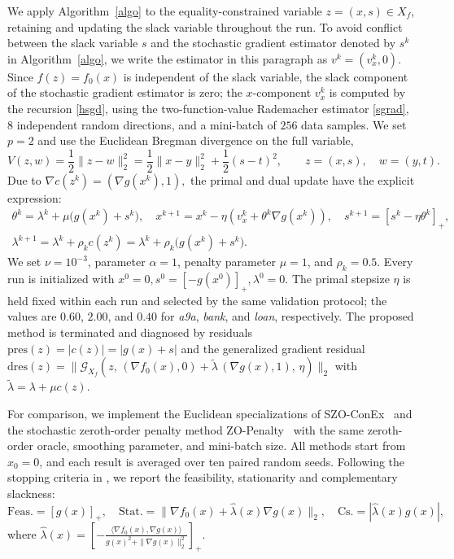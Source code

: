 \documentclass[11pt]{article}
\numberwithin{equation}{section}
\begin{document}
We apply Algorithm~\ref{algo} to the equality-constrained variable
\(z=(x,s)\in X_f\), retaining and updating the slack variable throughout the run.
To avoid conflict between the slack variable \(s\) and the stochastic gradient estimator
denoted by \(s^k\) in Algorithm~\ref{algo}, we write the estimator in this paragraph as
\(v^k=(v_x^k,0)\). Since \(f(z)=f_0(x)\) is independent of the slack variable, the slack
component of the stochastic gradient estimator is zero; the \(x\)-component \(v_x^k\)
is computed by the recursion \eqref{hsgd}, using the two-function-value Rademacher
estimator \eqref{sgrad}, \(8\)  independent random directions, and a mini-batch of
\(256\) data samples. 
We set \(p=2\) and use the Euclidean Bregman divergence on the full variable,
\[
V(z,w)=\frac12\|z-w\|_2^2
=\frac12\|x-y\|_2^2+\frac12(s-t)^2,
\qquad z=(x,s),\quad w=(y,t).
\]
Due to 
\(
\nabla c(z^k)=(\nabla g(x^k),1),
\)
the primal and dual update have the explicit expression:
\[
\begin{gathered}
\theta^k=\lambda^k+\mu\bigl(g(x^k)+s^k\bigr),\quad 
x^{k+1}
=x^k-\eta(v_x^k+\theta^k\nabla g(x^k)),\quad 
s^{k+1}
=[s^k-\eta\theta^k]_+,\\
\lambda^{k+1}
=\lambda^k+\rho_k c(z^k)
=\lambda^k+\rho_k\bigl(g(x^k)+s^k\bigr).
\end{gathered}
\]
We set \(\nu=10^{-3}\), parameter \(\alpha=1\), penalty parameter
\(\mu=1\), and \(\rho_k=0.5\). Every run is initialized with
\(
x^0=0, s^0=[-g(x^0)]_+, \lambda^0=0.
\)
The primal stepsize \(\eta\) is held fixed within each run and selected by the
same validation protocol; the values are \(0.60\), \(2.00\), and \(0.40\) for
\textit{a9a}, \textit{bank}, and \textit{loan}, respectively.
The proposed method is terminated and
diagnosed by  residuals
\(
\mathrm{pres}(z)=|c(z)|=|g(x)+s|
\)
and the generalized gradient residual
\(
\mathrm{dres}(z)
=\|
\mathcal G_{X_f}(
z,\,
(\nabla f_0(x),0)
+\tilde\lambda\,(\nabla g(x),1),\,
\eta)\|_2\) with \(
\tilde\lambda=\lambda+\mu c(z).
\)

For comparison, we implement the Euclidean specializations of SZO-ConEx~\cite{nguyen2022stochastic}
and the stochastic zeroth-order penalty method ZO-Penalty~\cite{wang2017penalty} with the same zeroth-order oracle,
smoothing parameter, and mini-batch size. All methods start from $x_0=0$, and each result is averaged over
ten paired random seeds. Following the stopping criteria in \cite{li2024stochastic}, we report the feasibility, stationarity and complementary slackness: 
\[
\mathrm{Feas.}=[g(x)]_+,\quad
\mathrm{Stat.}=\|\nabla f_0(x)+\widehat\lambda(x)\nabla g(x)\|_2,\quad
\mathrm{Cs.}=|\widehat\lambda(x)g(x)|,
\]
where
\(
\widehat\lambda(x)=
 [-\frac{\langle\nabla f_0(x),\nabla g(x)\rangle}
{g(x)^2+\|\nabla g(x)\|_2^2} ]_+ .
\)
\end{document}
